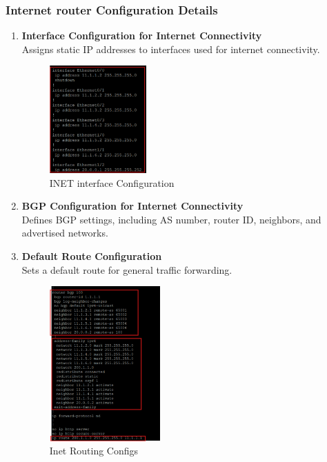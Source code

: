 \documentclass[12pt,english]{report}
\begin{document}
\subsubsection{Internet router Configuration Details}
\begin{enumerate}
    \item \textbf{Interface Configuration for Internet Connectivity} \\
    Assigns static IP addresses to interfaces used for internet connectivity.
\begin{figure}[H]
    \centering
    \includegraphics[width= 0.35\textwidth]{chapitre 3/2.png}
    \caption{INET interface Configuration}
    \label{fig: INET interface Configuration}
\end{figure}
    \item \textbf{BGP Configuration for Internet Connectivity} \\
    Defines BGP settings, including AS number, router ID, neighbors, and advertised networks.
    \item \textbf{Default Route Configuration} \\
    Sets a default route for general traffic forwarding.
\begin{figure}[H]
    \centering
    \includegraphics[width= 0.4\textwidth]{chapitre 3/3.png}
    \caption{Inet Routing Configs}
    \label{fig: Inet Routing Configs}
\end{figure}
\end{enumerate}     
\end{document}
